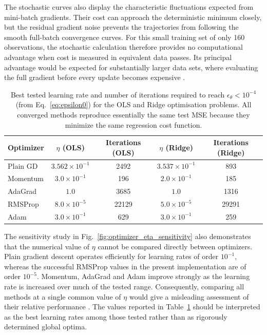 \documentclass[aps,rmp,reprint,amsmath,amssymb,graphicx,longbibliography]{revtex4-1}
\begin{document}
The stochastic curves also display the characteristic fluctuations expected
from mini-batch gradients. Their cost can approach the deterministic minimum
closely, but the residual gradient noise prevents the trajectories from
following the smooth full-batch convergence curves. For this small training
set of only 160 observations, the stochastic calculation therefore provides
no computational advantage when cost is measured in equivalent data passes.
Its principal advantage would be expected for substantially larger data sets,
where evaluating the full gradient before every update becomes expensive
\cite{HjorthJensen2026MLPSCh4}.

\begin{table}[t]
    \centering
    \caption{Best tested learning rate and number of iterations required to
    reach $\epsilon_\theta<10^{-4}$ (from Eq.~\eqref{eq:epsilon0}) for the OLS and Ridge optimisation
    problems. All converged methods reproduce essentially the same test MSE
    because they minimize the same regression cost function.}
    \label{tab:optimizer_comparison}
    \begin{tabular}{lcccc}
        \hline
        Optimizer &
        $\eta$ (OLS) &
        Iterations (OLS) &
        $\eta$ (Ridge) &
        Iterations (Ridge) \\
        \hline
        Plain GD  & $3.562\times10^{-1}$ & 2492
                  & $3.537\times10^{-1}$ & 893 \\
        Momentum  & $3.0\times10^{-1}$   & 196
                  & $2.0\times10^{-1}$   & 185 \\
        AdaGrad   & $1.0$                 & 3685
                  & $1.0$                 & 1316 \\
        RMSProp   & $8.0\times10^{-5}$   & 22129
                  & $5.0\times10^{-5}$   & 29291 \\
        Adam      & $3.0\times10^{-1}$   & 629
                  & $3.0\times10^{-1}$   & 259 \\
        \hline
    \end{tabular}
\end{table}

The sensitivity study in Fig.~\ref{fig:optimizer_eta_sensitivity} also
demonstrates that the numerical value of $\eta$ cannot be compared directly
between optimizers. Plain gradient descent operates efficiently for learning
rates of order $10^{-1}$, whereas the successful RMSProp values in the present
implementation are of order $10^{-5}$. Momentum, AdaGrad and Adam improve
strongly as the learning rate is increased over much of the tested range.
Consequently, comparing all methods at a single common value of $\eta$ would
give a misleading assessment of their relative performance
\cite{HjorthJensen2026MLPSCh4}. The values reported in
Table~\ref{tab:optimizer_comparison} should be interpreted as the
best learning rates among those tested rather than as rigorously determined
global optima.
\end{document}
